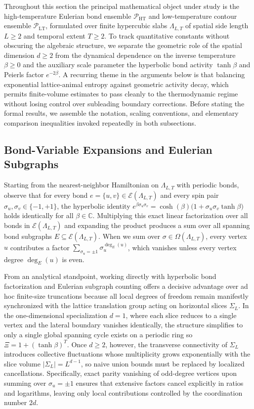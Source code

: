 \documentclass[11pt]{article}
\theoremstyle{definition}
\begin{document}
Throughout this section the principal mathematical object under study is the
high-temperature Eulerian bond ensemble $\mathcal{P}_{\mathrm{HT}}$ and
low-temperature contour ensemble $\mathcal{P}_{\mathrm{LT}}$, formulated over finite
hypercubic slabs $\Lambda_{L,T}$ of spatial side length $L \ge 2$ and temporal
extent $T \ge 2$. To track quantitative constants without obscuring the algebraic
structure, we separate the geometric role of the spatial dimension $d \ge 2$ from
the dynamical dependence on the inverse temperature $\beta \ge 0$ and the auxiliary
scale parameter the hyperbolic bond activity $\tanh \beta$ and Peierls factor
$e^{-2\beta}$. A recurring theme in the arguments below is that balancing
exponential lattice-animal entropy against geometric activity decay, which permits
finite-volume estimates to pass cleanly to the thermodynamic regime without losing
control over subleading boundary corrections. Before stating the formal results, we
assemble the notation, scaling conventions, and elementary comparison inequalities
invoked repeatedly in both subsections.

\subsection{Bond-Variable Expansions and Eulerian Subgraphs}
\label{subsec:s04a}

Starting from the nearest-neighbor Hamiltonian on $\Lambda_{L,T}$ with periodic
bonds, observe that for every bond $e = \{u, v\} \in \mathcal{E}(\Lambda_{L,T})$ and
every spin pair $\sigma_u, \sigma_v \in \{-1, +1\}$, the hyperbolic identity
$e^{\beta \sigma_u \sigma_v} = \cosh(\beta) \bigl(1 + \sigma_u \sigma_v \tanh
\beta\bigr)$ holds identically for all $\beta \in \mathbb{C}$. Multiplying this
exact linear factorization over all bonds in $\mathcal{E}(\Lambda_{L,T})$ and
expanding the product produces a sum over all spanning bond subgraphs $E \subseteq
\mathcal{E}(\Lambda_{L,T})$. When we sum over $\sigma \in \Omega(\Lambda_{L,T})$,
every vertex $u$ contributes a factor $\sum_{\sigma_u = \pm 1}
\sigma_u^{\deg_E(u)}$, which vanishes unless every vertex degree $\deg_E(u)$ is
even.

From an analytical standpoint, working directly with hyperbolic bond factorization
and Eulerian subgraph counting offers a decisive advantage over ad hoc finite-size
truncations because all local degrees of freedom remain manifestly synchronized with
the lattice translation group acting on horizontal slices $\Sigma_L$. In the
one-dimensional specialization $d = 1$, where each slice reduces to a single vertex
and the lateral boundary vanishes identically, the structure simplifies to only a
single global spanning cycle exists on a periodic ring so $\Xi = 1 + (\tanh
\beta)^T$. Once $d \ge 2$, however, the transverse connectivity of $\Sigma_L$
introduces collective fluctuations whose multiplicity grows exponentially with the
slice volume $|\Sigma_L| = L^{d-1}$, so naive union bounds must be replaced by
localized cancellations. Specifically, exact parity vanishing of odd-degree vertices
upon summing over $\sigma_u = \pm 1$ ensures that extensive factors cancel
explicitly in ratios and logarithms, leaving only local contributions controlled by
the coordination number $2d$.
\end{document}
